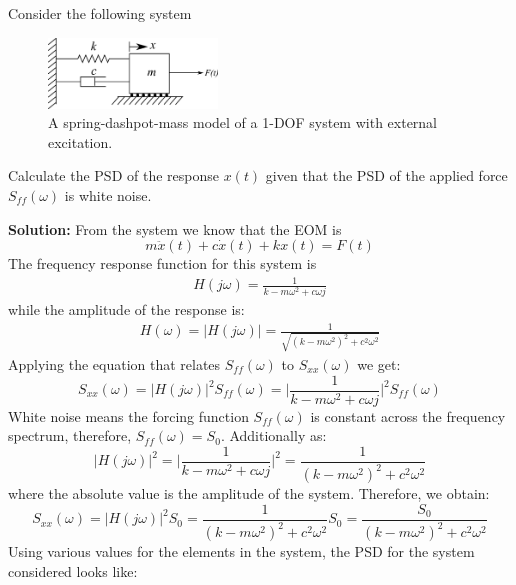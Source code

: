 \documentclass[12pt,letter]{article}
\begin{document}
\begin{example}
	Consider the following system
	\begin{figure}[H]
		\centering
		\includegraphics[width=0.4\textwidth]{../figures/1-DOF-spring_dashpot_mass_horizontal_forced.png}
		\caption{A spring-dashpot-mass model of a 1-DOF system with external excitation.}
	\end{figure}
	Calculate the PSD of the response $x(t)$ given that the PSD of the applied force $S_{ff}(\omega)$ is white noise. 
	
	\noindent\textbf{Solution:} From the system we know that the EOM is 
	\begin{equation}
	m\ddot{x}(t) +c\dot{x}(t) + kx(t) = F(t)
	\end{equation} 
	The frequency response function for this system is 
	\begin{eqnarray}
		H(j\omega) = \frac{1}{k-m\omega^2+c\omega j}
	\end{eqnarray}
	while the amplitude of the response is:
	\begin{eqnarray}
	H(\omega) = |H(j\omega)| = \frac{1}{\sqrt{(k-m\omega^2)^2+c^2\omega^2}}
	\end{eqnarray}
	Applying the equation that relates $S_{ff}(\omega)$ to $S_{xx}(\omega)$ we get:
	\begin{equation}
	S_{xx}(\omega) =  |H(j\omega)|^2 S_{ff}(\omega) = \bigg|\frac{1}{k-m\omega^2+c\omega j} \bigg|^2 S_{ff}(\omega) 
	\end{equation}
	White noise means the forcing function $S_{ff}(\omega)$ is constant across the frequency spectrum, therefore, $S_{ff}(\omega)=S_0$. Additionally as:
	\begin{equation}
	|H(j\omega)|^2 = \bigg|\frac{1}{k-m\omega^2+c\omega j} \bigg|^2 = \frac{1}{(k-m\omega^2)^2+c^2\omega^2}
	\end{equation}
	where the absolute value is the amplitude of the system. Therefore, we obtain:
	\begin{equation}
	S_{xx}(\omega) =  |H(j\omega)|^2 S_{0}= \frac{1}{(k-m\omega^2)^2+c^2\omega^2}S_0 = \frac{S_0}{(k-m\omega^2)^2+c^2\omega^2}
	\end{equation}
	Using various values for the elements in the system, the PSD for the system considered looks like:
	\begin{figure}[H]

\end{figure}
\end{example}
\end{document}
